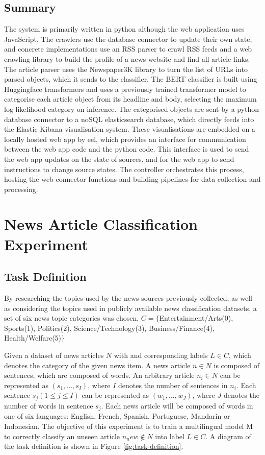 \documentclass{l4proj}
\begin{document}
\section{Summary}
The system is primarily written in python although the web application uses JavaScript. The crawlers use the database connector to update their own state, and concrete implementations use an RSS parser to crawl RSS feeds and a web crawling library to build the profile of a news website and find all article links. The article parser uses the Newspaper3K library to turn the list of URLs into parsed objects, which it sends to the classifier. The BERT classifier is built using Huggingface transformers and uses a previously trained transformer model to categorise each article object from its headline and body, selecting the maximum log likelihood category on inference. The categorised objects are sent by a python database connector to a noSQL elasticsearch database, which directly feeds into the Elastic Kibana visualisation system. These visualisations are embedded on a locally hosted web app by eel, which provides an interface for communication between the web app code and the python code. This interface is used to send the web app updates on the state of sources, and for the web app to send instructions to change source states. The controller orchestrates this process, hosting the web connector functions and building pipelines for data collection and processing.




\chapter{News Article Classification Experiment}

\section{Task Definition}
By researching the topics used by the news sources previously collected, as well as considering the topics used in publicly available news classification datasets, a set of six news topic categories was chosen, $C = \{$Entertainment/Arts(0), Sports(1), Politics(2), Science/Technology(3), Business/Finance(4), Health/Welfare(5)$\}$ \par
Given a dataset of news articles $N$ with and corresponding labels $L\in C$, which denotes the category of the given news item. A news article $n \in N$ is composed of sentences, which are composed of words. An arbitrary article $n_i \in N$ can be represented as $(s_1,...,s_I)$, where $I$ denotes the number of sentences in $n_i$. Each sentence $s_j (1 \leq j \leq I)$ can be represented as $(w_1,...,w_J)$, where $J$ denotes the number of words in sentence $s_j$. Each news article will be composed of words in one of six languages: English, French, Spanish, Portuguese, Mandarin or Indonesian. The objective of this experiment is to train a multilingual model M to correctly classify an unseen article $n_new \notin N$ into label $L\in C$. A diagram of the task definition is shown in Figure \ref{fig:task-definition}.
\end{document}
